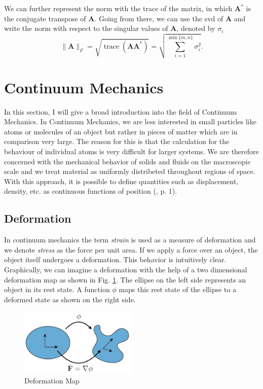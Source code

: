 We can further represent the norm with the trace of the matrix, in which $\mathbf{A}^*$ is the conjugate transpose of \textbf{A}. Going from there, we can use the \acrshort{svd} of \textbf{A} and write the norm with respect to the singular values of \textbf{A}, denoted by $\sigma_i$
\begin{equation} \label{eq:FN}
\| \mathbf{A} \|_{F} = \sqrt{\operatorname{trace}(\mathbf{A} \mathbf{A}^*)} = \sqrt{\sum\limits_{i=1}^{\operatorname{min}\{m,n\}} \sigma_i^2}.
\end{equation}


\section{Continuum Mechanics}
In this section, I will give a broad introduction into the field of Continuum Mechanics. In Continuum Mechanics, we are less interested in small particles like atoms or molecules of an object but rather in pieces of matter which are in comparison very large. The reason for this is that the calculation for the behaviour of individual atoms is very difficult for larger systems. We are therefore concerned with the mechanical behavior of solids and fluids on the macroscopic scale and we treat material as uniformly distribeted throughout regions of space. With this approach, it is possible to define quantities such as displacement, density, etc. as continuous functions of position (\cite{Spencer1980}, p. 1).


\subsection{Deformation}
In continuum mechanics the term \textit{strain} is used as a measure of deformation and we denote \textit{stress} as the force per unit area. If we apply a force over an object, the object itself undergoes a deformation. This behavior is intuitively clear. Graphically, we can imagine a deformation with the help of a two dimensional deformation map as shown in Fig. \ref{fig:deformationmap}. The ellipse on the left side represents an object in its rest state. A function $\phi$ maps this rest state of the ellipse to a deformed state as shown on the right side.

\begin{figure}[!htbp]
	\centering
	\includegraphics[width=0.5\textwidth]{resources/deformation_map}
	\caption[Deformation Map]{Deformation Map {\cite{STREAM2018}}}
	\label{fig:deformationmap}
\end{figure}

